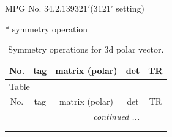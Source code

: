 \documentclass[fleqn,8pt]{jsarticle}
\begin{document}
\setcounter{MaxMatrixCols}{32}

\renewcommand{\tablename}{Table~}
\renewcommand{\figurename}{Figure~}
\begin{center}
\LARGE
MPG No. 34.2.139\quad$321'$\quad(3121' setting)
\end{center}
* symmetry operation
\renewcommand{\arraystretch}{1.3}
\begin{longtable}{ccccc}
\caption{Symmetry operations for 3d polar vector.}
 \\
 \hline \hline
No. & tag & matrix (polar) & det & TR \\ \hline \endfirsthead

\multicolumn{4}{l}{\tablename\ \thetable{}} \\
 \hline \hline
No. & tag & matrix (polar) & det & TR \\ \hline \endhead

 \hline \hline
\multicolumn{4}{r}{\footnotesize\it continued ...} \\ \endfoot

 \hline \hline
\multicolumn{4}{r}{} \\ \endlastfoot


\end{longtable}
\end{document}

